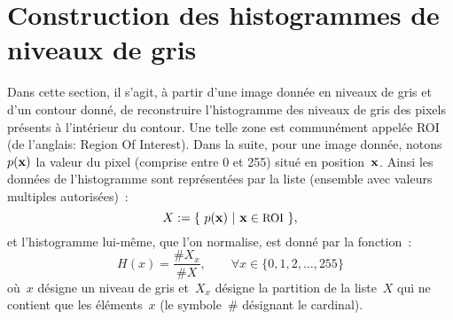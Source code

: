 \documentclass[main.tex]{subfiles}
\begin{document}
\section{Construction des histogrammes de niveaux de gris}
Dans cette section, il s'agit, à partir d'une image donnée en niveaux de gris et d'un contour donné, de reconstruire l'histogramme des niveaux de gris des pixels présents à l'intérieur du contour. Une telle zone est communément appelée ROI (de l'anglais: Region Of Interest). Dans la suite, pour une image donnée, notons~$p(\mathbf{x})$ la valeur du pixel (comprise entre 0 et 255) situé en position~$\mathbf{x}$. Ainsi les données de l'histogramme sont représentées par la liste (ensemble avec valeurs multiples autorisées)~:
\begin{equation}
\label{eq:def_data_histo}
X:=\{ \ p(\mathbf{x}) \  | \  \mathbf{x} \in \textrm{\small ROI} \ \},
\end{equation}
et l'histogramme lui-même, que l'on normalise, est donné par la fonction~:
\begin{equation}
\label{eq:def_histo}
H(x) = \dfrac{ \# X_x  }{ \# X }, \qquad \forall x \in \{ 0,1,2,\ldots,255 \}
\end{equation}
où~$x$ désigne un niveau de gris et~$X_x$ désigne la partition de la liste~$X$ qui ne contient que les éléments~$x$ (le symbole~$\#$ désignant le cardinal).
\end{document}

